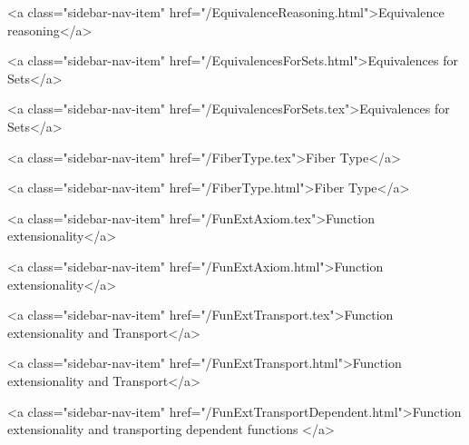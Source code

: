      
        
          <a class="sidebar-nav-item" href="/EquivalenceReasoning.html">Equivalence reasoning</a>
        
      
    
      
        
          <a class="sidebar-nav-item" href="/EquivalencesForSets.html">Equivalences for Sets</a>
        
      
    
      
        
          <a class="sidebar-nav-item" href="/EquivalencesForSets.tex">Equivalences for Sets</a>
        
      
    
      
        
          <a class="sidebar-nav-item" href="/FiberType.tex">Fiber Type</a>
        
      
    
      
        
          <a class="sidebar-nav-item" href="/FiberType.html">Fiber Type</a>
        
      
    
      
        
          <a class="sidebar-nav-item" href="/FunExtAxiom.tex">Function extensionality</a>
        
      
    
      
        
          <a class="sidebar-nav-item" href="/FunExtAxiom.html">Function extensionality</a>
        
      
    
      
        
          <a class="sidebar-nav-item" href="/FunExtTransport.tex">Function extensionality and Transport</a>
        
      
    
      
        
          <a class="sidebar-nav-item" href="/FunExtTransport.html">Function extensionality and Transport</a>
        
      
    
      
        
          <a class="sidebar-nav-item" href="/FunExtTransportDependent.html">Function extensionality and transporting dependent functions </a>
        
      
    
      
        
